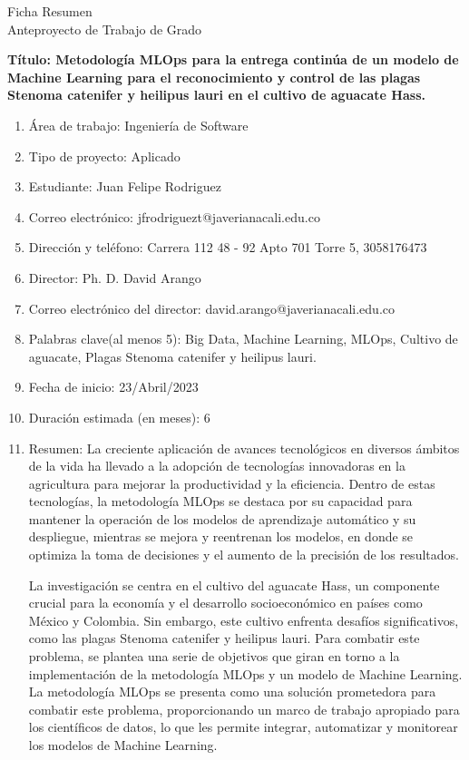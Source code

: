\thispagestyle{empty}
\begin{center}
    \Large{Ficha Resumen \\ Anteproyecto de Trabajo de Grado}
\end{center}

\textbf{Título: Metodología MLOps para la entrega continúa de un modelo de Machine Learning para el reconocimiento y control de las plagas Stenoma catenifer y heilipus lauri en el cultivo de aguacate Hass.}
\begin{enumerate}
    \item Área de trabajo: Ingeniería de Software
    \item Tipo de proyecto: Aplicado
    \item Estudiante: Juan Felipe Rodriguez
    \item Correo electrónico: jfrodriguezt@javerianacali.edu.co
    \item Dirección y teléfono: Carrera 112 48 - 92 Apto 701 Torre 5, 3058176473
    \item Director: Ph. D. David Arango
    \item Correo electrónico del director: david.arango@javerianacali.edu.co
    \item Palabras clave(al menos 5): Big Data, Machine Learning, MLOps, Cultivo de aguacate, Plagas Stenoma catenifer y heilipus lauri.
    \item Fecha de inicio: 23/Abril/2023
    \item Duración estimada (en meses): 6
    \item Resumen: La creciente aplicación de avances tecnológicos en diversos ámbitos de la vida ha llevado a la adopción de tecnologías innovadoras en la agricultura para mejorar la productividad y la eficiencia. Dentro de estas tecnologías, la metodología MLOps se destaca por su capacidad para mantener la operación de los modelos de aprendizaje automático y su despliegue, mientras se mejora y reentrenan los modelos, en donde se optimiza la toma de decisiones y el aumento de la precisión de los resultados.
\newpage
\thispagestyle{empty}

    La investigación se centra en el cultivo del aguacate Hass, un componente crucial para la economía y el desarrollo socioeconómico en países como México y Colombia. Sin embargo, este cultivo enfrenta desafíos significativos, como las plagas Stenoma catenifer y heilipus lauri. Para combatir este problema, se plantea una serie de objetivos que giran en torno a la implementación de la metodología MLOps y un modelo de Machine Learning. La metodología MLOps se presenta como una solución prometedora para combatir este problema, proporcionando un marco de trabajo apropiado para los científicos de datos, lo que les permite integrar, automatizar y monitorear los modelos de Machine Learning.


\end{enumerate}

